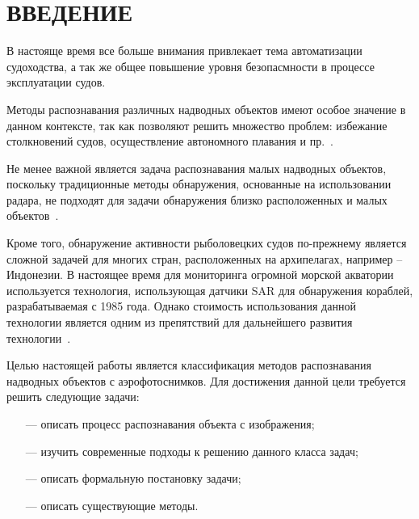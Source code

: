 \chapter*{ВВЕДЕНИЕ}

В настояще время все больше внимания привлекает тема автоматизации судоходства, а так же общее повышение уровня безопасмности в процессе эксплуатации судов.

Методы распознавания различных надводных объектов имеют особое значение в данном контексте, так как позволяют решить множество проблем: избежание столкновений судов, осуществление автономного плавания и пр.~\cite{ship-detection}.

Не менее важной является задача распознавания малых надводных объектов, поскольку традиционные методы обнаружения, основанные на использовании радара, не подходят для задачи обнаружения близко расположенных и малых объектов~\cite{small-ship-detection}.

Кроме того, обнаружение активности рыболовецких судов по-прежнему является сложной задачей для многих стран, расположенных на архипелагах, например -- Индонезии. В настоящее время для мониторинга огромной морской акватории используется технология, использующая датчики SAR для обнаружения кораблей, разрабатываемая с 1985 года. Однако стоимость использования данной технологии является одним из препятствий для дальнейшего развития технологии~\cite{boats-recognition}.

Целью настоящей работы является классификация методов распознавания надводных объектов с аэрофотоснимков. Для достижения данной цели требуется решить следующие задачи:
\begin{itemize}
    \item[---] описать процесс распознавания объекта с изображения;
    \item[---] изучить современные подходы к решению данного класса задач;
    \item[---] описать формальную постановку задачи;
    \item[---] описать существующие методы.
\end{itemize}